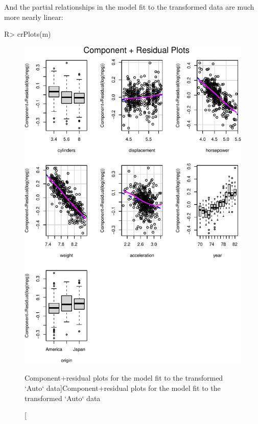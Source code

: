 \documentclass[
]{jss}
\begin{document}
And the partial relationships in the model fit to the transformed data
are much more nearly linear:

\begin{CodeChunk}
\begin{CodeInput}
R> crPlots(m)
\end{CodeInput}
\begin{figure}

{\centering \includegraphics[width=1\linewidth]{JSS-article-reduced_files/figure-latex/Auto-CR-plots-transformed-1} 

}

\caption[Component+residual plots for the model fit to the transformed `Auto` data]{Component+residual plots for the model fit to the transformed `Auto` data}\label{fig:Auto-CR-plots-transformed}
\end{figure}
\end{CodeChunk}
\end{document}
